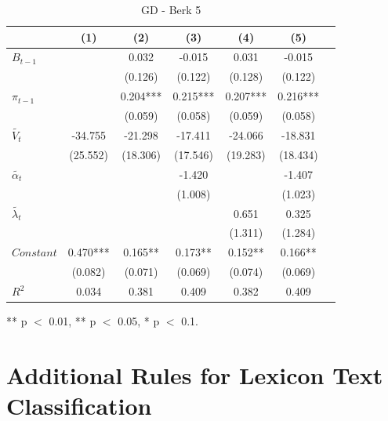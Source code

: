 \documentclass[review]{elsarticle}
\begin{document}
\begin{table}[!ht]
\centering 
  \caption{GD - Berk 5} 
  \label{tab:GD - Berk 5}
\begin{tabular}{l*{6}{c}}   
\toprule
                    & (1) & (2) & (3) & (4) & (5) \\
\midrule
$B_{t-1}$           &     & 0.032 & -0.015 & 0.031 & -0.015 \\
                    &     & (0.126) & (0.122) & (0.128) & (0.122) \\
$\pi_{t-1}$         &     & 0.204*** & 0.215*** & 0.207*** & 0.216*** \\
                    &     & (0.059) & (0.058) & (0.059) & (0.058) \\
$\tilde{V_t}$       & -34.755 & -21.298 & -17.411 & -24.066 & -18.831 \\
                    & (25.552) & (18.306) & (17.546) & (19.283) & (18.434) \\
$\tilde{\alpha_t}$  &     &     & -1.420 &     & -1.407 \\
                    &     &     & (1.008) &     & (1.023) \\
$\tilde{\lambda_t}$ &     &     &     & 0.651 & 0.325 \\
                    &     &     &     & (1.311) & (1.284) \\
$Constant$          & 0.470*** & 0.165** & 0.173** & 0.152** & 0.166** \\
                    & (0.082) & (0.071) & (0.069) & (0.074) & (0.069) \\
\midrule
$R^2$               & 0.034 & 0.381 & 0.409 & 0.382 & 0.409 \\
\bottomrule
\end{tabular} 
\parbox{0.8\textwidth}{\centering \small *** p $<$ 0.01, ** p $<$ 0.05, * p $<$ 0.1.}
\end{table}


\section{Additional Rules for Lexicon Text Classification}\label{sec:Additional Rules for Lexicon Text Classification}
\end{document}
